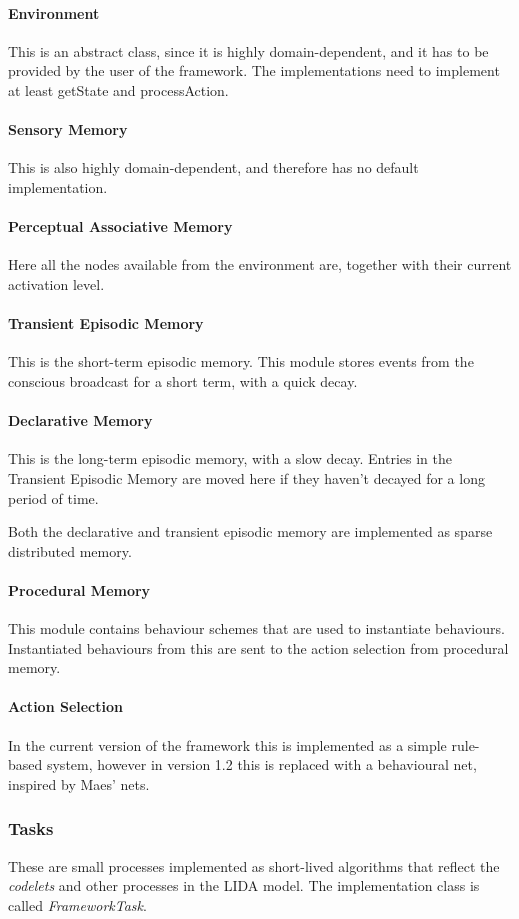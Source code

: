 \paragraph{Environment} This is an abstract class, since it is highly domain-dependent, and it has to be provided by the user of the framework. The implementations need to implement at least getState and processAction.
\paragraph{Sensory Memory} This is also highly domain-dependent, and therefore has no default implementation.
\paragraph{Perceptual Associative Memory} Here all the nodes available from the environment are, together with their current activation level.
\paragraph{Transient Episodic Memory} This is the short-term episodic memory. This module stores events from the conscious broadcast for a short term, with a quick decay.
\paragraph{Declarative Memory} This is the long-term episodic memory, with a slow decay. Entries in the Transient Episodic Memory are moved here if they haven't decayed for a long period of time.

Both the declarative and transient episodic memory are implemented as sparse distributed memory.\cite{kanerva1988sparse}
\paragraph{Procedural Memory} This module contains behaviour schemes that are used to instantiate behaviours. Instantiated behaviours from this are sent to the action selection from procedural memory.
\paragraph{Action Selection} In the current version of the framework this is implemented as a simple rule-based system, however in version 1.2 this is replaced with a behavioural net, inspired by Maes' nets.\cite{maes1989right}

\subsubsection{Tasks}
These are small processes implemented as short-lived algorithms that reflect the {\em codelets} and other processes in the LIDA model. The implementation class is called {\em FrameworkTask}.

